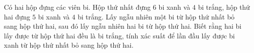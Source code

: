 \begin{ex}
Có hai hộp đựng các viên bi. Hộp thứ nhất đựng $6$ bi xanh và $4$ bi trắng, hộp thứ hai đựng $5$ bi xanh và $4$ bi trắng. Lấy ngẫu nhiên một bi từ hộp thứ nhất bỏ sang hộp thứ hai, sau đó lấy ngẫu nhiên hai bi từ hộp thứ hai. Biết rằng hai bi lấy được từ hộp thứ hai đều là bi trắng, tính xác suất để lần đầu lấy được bi xanh từ hộp thứ nhất bỏ sang hộp thứ hai.
\end{ex}
